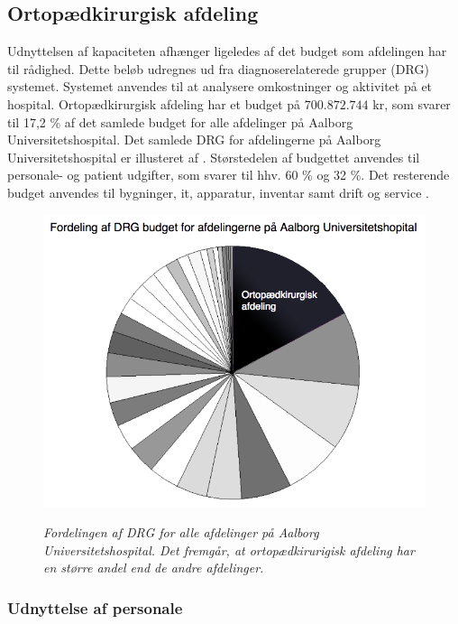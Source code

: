 \subsection{Ortopædkirurgisk afdeling}
Udnyttelsen af kapaciteten afhænger ligeledes af det budget som afdelingen har til rådighed. Dette beløb udregnes ud fra diagnoserelaterede grupper (DRG) systemet. Systemet anvendes til at analysere omkostninger og aktivitet på et hospital.\cite{DRG2016} Ortopædkirurgisk afdeling har et budget på $700.872.744$ kr, som svarer til 17,2 \% af det samlede budget for alle afdelinger på Aalborg Universitetshospital. Det samlede DRG for afdelingerne på Aalborg Universitetshospital er illusteret af .\cite{Rasmussen2016}
Størstedelen af budgettet anvendes til personale- og patient udgifter, som svarer til hhv. 60 \% og 32 \%. Det resterende budget anvendes til bygninger, it, apparatur, inventar samt drift og service \cite{Nøgletal2016}. 

\begin{figure}[H]
\flushleft 
	\centering
	\includegraphics[scale=.45]{figures/ortopaeddiagram.png}
	\label{DRG_budget}
	\flushleft
	\caption{\textit{Fordelingen af DRG for alle afdelinger på Aalborg Universitetshospital. Det fremgår, at ortopædkirurigisk afdeling har en større andel end de andre afdelinger. \cite{Rasmussen2016}}}
\end{figure}


\subsubsection{Udnyttelse af personale} 

